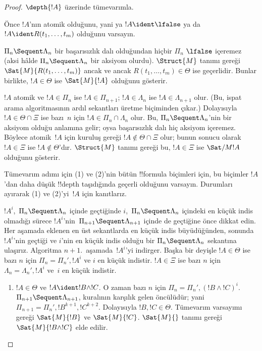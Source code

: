 \begin{proof}
  $\depth{!A}$ üzerinde tümevarımla.

Önce $!A$'nın atomik olduğunu, yani ya $!A \ident \lfalse$ ya da $!A
\ident R(t_1, \dots, t_m)$ olduğunu varsayın.

$\Pi_n \Sequent \Lambda_n$ bir başarısızlık dalı olduğundan hiçbir $\Pi_n$
$\lfalse$ içeremez (aksi hâlde $\Pi_n \Sequent \Lambda_n$ bir aksiyom
olurdu). $\Struct{M}$ tanımı gereği $\Sat{M}{R(t_1, \dots, t_m)}$ ancak ve
ancak $R(t_1, \dots, t_m) \in \Theta$ ise geçerlidir. Bunlar birlikte,
$!A \in \Theta$ ise $\Sat{M}{!A}$ olduğunu gösterir.

$!A$ atomik ve $!A \in \Pi_n$ ise $!A \in \Pi_{n+1}$; $!A \in
\Lambda_n$ ise $!A \in \Lambda_{n+1}$ olur. (Bu, ispat arama
algoritmasının ardıl sekantları üretme biçiminden çıkar.) Dolayısıyla $!A
\in \Theta \cap \Xi$ ise bazı~$n$ için $!A \in \Pi_n \cap \Lambda_n$
olur. Bu, $\Pi_n \Sequent \Lambda_n$'nin bir aksiyom olduğu anlamına gelir;
oysa başarısızlık dalı hiç aksiyom içeremez. Böylece atomik~$!A$ için kuruluş
gereği $!A \notin \Theta \cap \Xi$ olur; bunun sonucu olarak $!A \in \Xi$
ise $!A \notin \Theta$'dır. $\Struct{M}$ tanımı gereği bu, $!A \in \Xi$
ise $\Sat/{M}{!A}$ olduğunu gösterir.

Tümevarım adımı için (1) ve (2)'nin bütün !!{formula} biçimleri için,
bu biçimler $!A$'dan daha düşük !!{depth} taşıdığında geçerli olduğunu
varsayın. Durumları ayırarak (1) ve
(2)'yi~$!A$ için kanıtlarız.

$!A^i$,~$\Pi_n \Sequent \Lambda_n$ içinde geçtiğinde $i$,~$\Pi_n \Sequent
\Lambda_n$ içindeki en küçük indis olmadığı sürece $!A^i$'nin~$\Pi_{n+1}
\Sequent \Lambda_{n+1}$ içinde de geçtiğine önce dikkat edin. Her aşamada
eklenen en üst sekantlarda en küçük indis büyüdüğünden, sonunda $!A^i$'nin
geçtiği ve $i$'nin en küçük indis olduğu bir $\Pi_n \Sequent \Lambda_n$
sekantına ulaşırız. Algoritma $n+1$.~aşamada~$!A^i$'yi indirger. Başka bir
deyişle $!A \in \Theta$ ise bazı $n$ için $\Pi_n = \Pi_n', !A^i$ ve $i$ en
küçük indistir. $!A \in \Xi$ ise bazı $n$ için $\Lambda_n = \Lambda_n',
!A^i$ ve~$i$ en küçük indistir.

\begin{enumerate}
  \item $!A \in \Theta$ ve $!A \ident !B \land !C$. O zaman bazı $n$ için
  $\Pi_n = \Pi_n', (!B \land !C)^i$. $\Pi_{n+1} \Sequent \Lambda_{n+1}$,
  \LeftR{\land} kuralının karşılık gelen öncülüdür; yani $\Pi_{n+1} =
  \Pi_n', !B^{k+1}, !C^{k+2}$. Dolayısıyla $!B, !C \in \Theta$.
  Tümevarım varsayımı gereği $\Sat{M}{!B}$ ve $\Sat{M}{!C}$. $\Sat{M}{}$
  tanımı gereği $\Sat{M}{!B \land !C}$ elde edilir.


\end{enumerate}
\end{proof}
